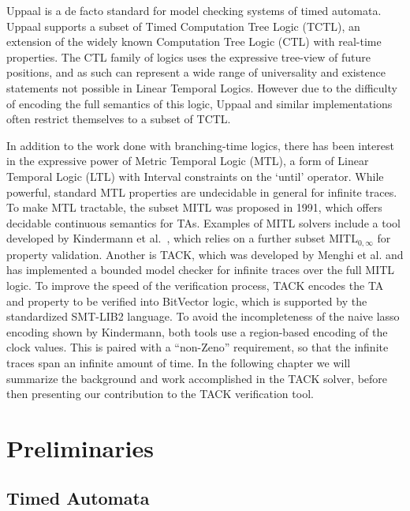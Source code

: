 \documentclass[a4paper,11pt]{report}
\theoremstyle{definition}
\begin{document}
Uppaal\cite{larsen97} is a de facto standard for model checking systems of timed
automata. Uppaal supports a subset of Timed Computation Tree Logic (TCTL), an
extension of the widely known Computation Tree Logic (CTL) with real-time
properties. The CTL family of logics uses the expressive tree-view of future
positions, and as such can represent a wide range of universality and existence
statements not possible in Linear Temporal Logics. However due to the difficulty
of encoding the full semantics of this logic, Uppaal and similar implementations
often restrict themselves to a subset of TCTL.

In addition to the work done with branching-time logics, there has been interest
in the expressive power of Metric Temporal Logic (MTL), a form of Linear
Temporal Logic (LTL) with Interval constraints on the `until' operator. While
powerful, standard MTL properties are undecidable in general for infinite
traces\cite{bouyer09}. To make MTL tractable, the subset MITL was proposed in
1991\cite{Alur91thebenefits}, which offers decidable continuous semantics for
TAs. Examples of MITL solvers include a tool developed by Kindermann et al.\
\cite{kindermann13}, which relies on a further subset $\text{MITL}_{0,\infty}$
for property validation. Another is TACK, which was developed by Menghi et
al.\cite{tack20} and has implemented a bounded model checker for infinite traces
over the full MITL logic. To improve the speed of the verification process, TACK
encodes the TA and property to be verified into BitVector logic, which is
supported by the standardized SMT-LIB2 language.\cite{baresi15,baresi16} To
avoid the incompleteness of the naive lasso encoding shown by
Kindermann\cite{kindermann12}, both tools use a region-based encoding of the
clock values. This is paired with a ``non-Zeno'' requirement, so that the
infinite traces span an infinite amount of time. In the following chapter we
will summarize the background and work accomplished in the TACK solver, before
then presenting our contribution to the TACK verification tool.

\chapter{Preliminaries}\label{prelims}
\section{Timed Automata}\label{timed-automata}
\end{document}
